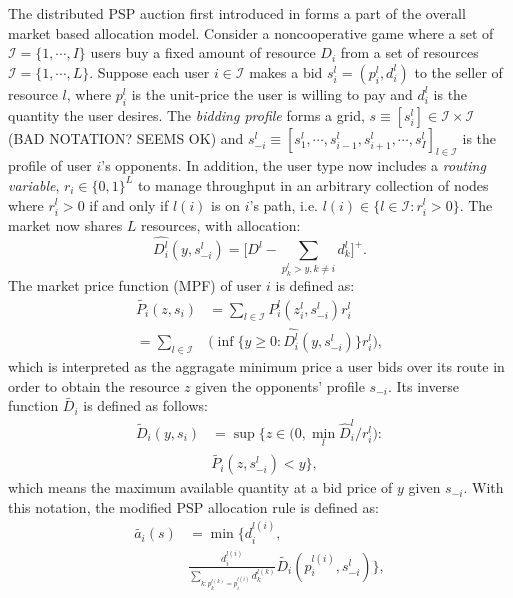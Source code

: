 \documentclass[12pt]{article}
\theoremstyle{definition}
\newcommand{\mcI}{\mathcal{I}}
\begin{document}
\begin{multicols}{2}
The distributed PSP auction first introduced in \cite{lazar} forms a part of the
overall market based allocation model. Consider a noncooperative game
where a set of $\mcI = \lbrace 1,\cdots,I\rbrace$ users buy a fixed
amount of resource $D_i$ from a set of resources $\mcI = \lbrace 1,\cdots,L\rbrace$. Suppose
each user $i \in \mcI$ makes a bid $s_i^l = (p_i^l, d_i^l)$ to the
seller of resource $l$,
where $p_i^l$ is the unit-price the user is willing to pay and $d_i^l$ is the
quantity the user desires. The \emph{bidding profile} forms a grid, $s \equiv
[s_i^l] \in \mcI \times \mcI$ (BAD NOTATION?
SEEMS OK)  and $s_{−i}^l \equiv [s_1^l , \cdots , s_{i−1}^l , s_{i+1}^l , \cdots
, s_I^l]_{l\in\mcI}$ is
the profile of user $i$’s opponents. In addition, the user type now includes a
\emph{routing variable}, $r_i\in\lbrace 0, 1\rbrace^L$ to manage throughput in
an arbitrary collection of nodes where $r_i^l >0$ if and only if $l(i)$ is on
$i$'s path, i.e. $l(i) \in \lbrace l\in \mcI : r_i^l >0\rbrace$. 
The market now shares $L$ resources, with allocation:
$$
    \hat{D_i^l}(y,s_{-i}^l) = \bigg\lbrack D^l -
\displaystyle\sum_{p_k^l > y, k\ne i} d_k^l\bigg\rbrack^+.
$$
The market price function (MPF) of user $i$ is defined as:
\begin{align*}
    \tilde{P_i}(z, s_i) &= \displaystyle\sum_{l\in\mcI}P_i^l(z_i^l,
s_{-i}^l)r_i^l \\
    = \displaystyle\sum_{l\in\mcI}&\bigg(\inf\bigg\lbrace y\ge 0 :
\hat{D_i^l}(y,s_{-i}^l)\bigg\rbrace r_i^l\bigg),
\end{align*}
which is interpreted as the aggragate minimum price a user bids over its route in order to obtain the
resource $z$ given the opponents’ profile $s_{−i}$. Its inverse function
$\tilde{D_i}$ is defined as follows:
\begin{align*}
    \tilde{D}_i(y, s_i) &= \sup\bigg\lbrace z\in \bigg( 0,
\min_l\hat{D}_i^l/r_i^l\bigg) : \\
    &\tilde{P_i}(z,s_{-i}^l) < y\bigg\rbrace,
\end{align*}
which means the maximum available quantity at a bid price of $y$ given
$s_{−i}$. With this notation, the modified PSP allocation rule \cite{tuffin} is defined
as:
\begin{align*}
    \tilde{a_i}(s) &= \min\big\lbrace d_i^{l(i)}, \\
 &\frac{d_i^{l(i)}}{\sum_{k:p_k^{l(k)}=p_i^{l(i)}}d_k^{l(k)}} \tilde{D_i}(p_i^{l(i)},
s_{-i}^l)\big\rbrace,
\end{align*}

\end{multicols}
\end{document}

